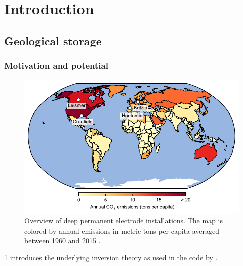 \chapter{Introduction}\label{chap:theory}
\minitoc
\vfill
{}

\section{Geological \co storage}

\subsection{Motivation and potential}
\citep{Archie1942}
\Blindtext



\begin{figure}[htbp]
	\centering
	\includegraphics[width=.9\textwidth]{figs/map.pdf}
	\caption{Overview of deep permanent electrode installations. The map is colored by annual \co emissions in metric tons per capita averaged between 1960 and 2015 \citep{Bank2015}.}
	\label{fig:map}
\end{figure}
%

\cref{chap:theory} introduces the underlying inversion theory as used in the code by \cite{Ruecker2017}.
